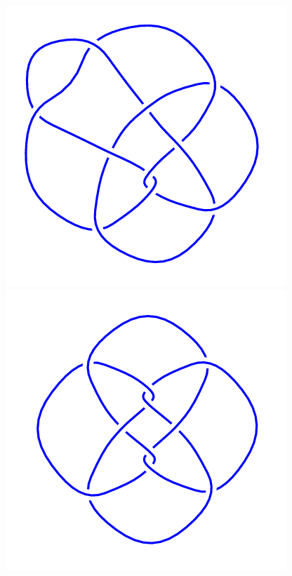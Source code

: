 \begin{figure}[H]
\begin{minipage}[b]{.18\linewidth}
    \end{minipage}
    \begin{minipage}[b]{.18\linewidth}
        \centering
        \includegraphics[width=\linewidth]{../data/10_119.png}
    \end{minipage}
    \begin{minipage}[b]{.18\linewidth}
        \centering
        \includegraphics[width=\linewidth]{../data/10_120.png}

\end{minipage}
\end{figure}
